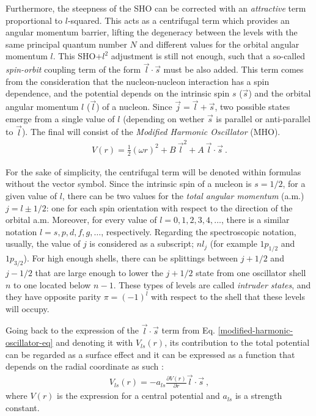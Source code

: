 Furthermore, the steepness of the SHO can be corrected with an \emph{attractive} term proportional to $l$-squared. This acts as a centrifugal term which provides an angular momentum barrier, lifting the degeneracy between the levels with the same principal quantum number $N$ and different values for the orbital angular momentum $l$. This SHO+$l^2$ adjustment is still not enough, such that a so-called \emph{spin-orbit} coupling term of the form $\vec{l}\cdot\vec{s}$ must be also added. This term comes from the consideration that the nucleon-nucleon interaction has a spin dependence, and the potential depends on the intrinsic spin $s$ ($\vec{s}$) and the orbital angular momentum $l$ ($\vec{l}$) of a nucleon. Since $\vec{j}=\vec{l}+\vec{s}$, two possible states emerge from a single value of $l$ (depending on wether $\vec{s}$ is parallel or anti-parallel to $\vec{l}$). The final will consist of the \emph{Modified Harmonic Oscillator} (MHO).
\begin{align}
    V(r)=\frac{1}{2}(\omega r)^2+B\ \vec{l}^2+A\ \vec{l}\cdot\vec{s}\ .
    \label{modified-harmonic-oscillator-eq}
\end{align}

For the sake of simplicity, the centrifugal term will be denoted within formulas without the vector symbol. Since the intrinsic spin of a nucleon is $s=1/2$, for a given value of $l$, there can be two values for the \emph{total angular momentum} (a.m.) $j=l\pm1/2$: one for each spin orientation with respect to the direction of the orbital a.m. Moreover, for every value of $l=0,1,2,3,4,\dots$, there is a similar notation $l=s,p,d,f,g,\dots$, respectively. Regarding the spectroscopic notation, usually, the value of $j$ is considered as a subscript; $nl_j$ (for example $1p_{1/2}$ and $1p_{3/2}$). For high enough shells, there can be splittings between $j+1/2$ and $j-1/2$ that are large enough to lower the $j+1/2$ state from one oscillator shell $n$ to one located below $n-1$. These types of levels are called \emph{intruder states}, and they have opposite parity $\pi=(-1)^l$ with respect to the shell that these levels will occupy.

Going back to the expression of the $\vec{l}\cdot\vec{s}$ term from Eq. \ref{modified-harmonic-oscillator-eq} and denoting it with $V_{ls}(r)$, its contribution to the total potential can be regarded as a surface effect and it can be expressed as a function that depends on the radial coordinate as such \cite{casten2000nuclear}:
\begin{align}
    V_{ls}(r)=-a_{ls}\frac{\partial V(r)}{\partial r}\vec{l}\cdot\vec{s}\ ,
\end{align}
where $V(r)$ is the expression for a central potential and $a_{ls}$ is a strength constant.

